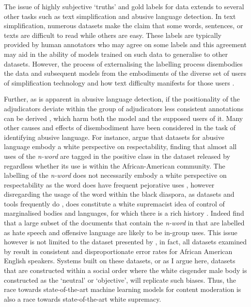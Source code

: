 
The issue of highly subjective `truths' and gold labels for data extends to several other tasks such as text simplification and abusive language detection. In text simplification, numerous datasets make the claim that some words, sentences, or texts are difficult to read while others are easy. These labels are typically provided by human annotators who may agree on some labels and this agreement may aid in the ability of models trained on such data to generalise to other datasets. However, the process of externalising the labelling process disembodies the data and subsequent models from the embodiments of the diverse set of users of simplification technology and how text difficulty manifests for those users \citep{Bingel:2018}.

Further, as is apparent in abusive language detection, if the positionality of the adjudicators deviate within the group of adjudicators less consistent annotations can be derived \citep{Waseem:2016}, which harm both the model and the supposed users of it. Many other causes and effects of disembodiment have been considered in the task of identifying abusive language. For instance, \citet{Waseem:2018} argue that datasets for abusive language embody a white perspective on respectability, finding that almost all uses of the \textit{n-word} are tagged in the positive class in the dataset released by \citet{Davidson:2017} regardless whether its use is within the African-American community. The labelling of the \textit{n-word} does not necessarily embody a white perspective on respectability as the word does have frequent pejorative uses \citep{Croom:2013}, however disregarding the usage of the word within the black diaspora, as datasets and tools frequently do \citep{Davidson:2019}, does constitute a white supremacist idea of control of marginalised bodies and languages, for which there is a rich history \citep{Craft:2020}. Indeed \citet{Waseem:2018} find that a large subset of the documents that contain the \textit{n-word} in \citet{Davidson:2017} that are labelled as hate speech and offensive language are likely to be in-group uses. This issue however is not limited to the dataset presented by \citet{Davidson:2017}, in fact, all datasets examined by \citet{Davidson:2019} result in consistent and disproportionate error rates for African American English speakers. Systems built on these datasets, or as I argue here, datasets that are constructed within a social order where the white cisgender male body is constructed as the `neutral' or `objective', will replicate such biases. Thus, the race towards state-of-the-art machine learning models for content moderation is also a race towards state-of-the-art white supremacy.

